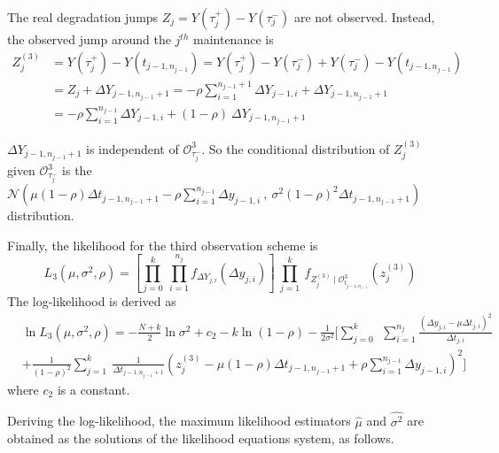 \noindent The real degradation jumps $Z_j = Y(\tau_{j}^+) - Y(\tau_{j}^-)$ are not observed.
Instead, the observed jump around the $j^{th}$ maintenance is 
\begin{align}
Z_j^{(3)} &= Y(\tau_j^+)-Y(t_{j-1,n_{j-1}}) = Y(\tau_j^+)-Y(\tau_j^-)+Y(\tau_j^-)-Y(t_{j-1,n_{j-1}}) \nonumber \\
&= Z_j +\Delta Y_{j-1,n_{j-1}+1} = -\rho\sum\limits_{i=1}^{n_{j-1}+1}\Delta Y_{j-1,i} + \Delta Y_{j-1,n_{j-1}+1} \nonumber \\
&= -\rho\sum\limits_{i=1}^{n_{j-1}}\Delta Y_{j-1,i} + (1-\rho)\ \Delta Y_{j-1,n_{j-1}+1} \label{eq:Zj3}
\end{align}

\noindent $\Delta Y_{j-1,n_{j-1}+1}$ is independent of $\mathcal{O}_{\tau_j^-}^3$. So the conditional distribution of $Z_j^{(3)}$ given $\mathcal{O}_{\tau_j^-}^3$ is the $\mathcal{N}\left(\mu (1-\rho) \Delta t_{j-1,n_{j-1}+1}-\rho \sum\limits_{i=1}^{n_{j-1}} \Delta y_{j-1,i}\ ,\ \sigma^2 (1-\rho)^2 \Delta t_{j-1,n_{j-1}+1}\right)$ distribution.

\noindent Finally, the likelihood for the third observation scheme is
\begin{equation}
L_3\left(\mu,\sigma^2,\rho \right)
= \left[ \prod \limits_{j=0}^{k} \ \prod \limits_{i=1}^{n_{j}}  f_{\Delta Y_{j,i}}(\Delta y_{j,i}) \right]\ 
 \prod \limits_{j=1}^{k}\ f_{Z_j^{(3)} \mid  \mathcal{O}_{t_{j-1,n_{j-1}}}^3}(z_j^{(3)}) 
\label{eq:like_scheme3}
\end{equation}
\noindent The log-likelihood is derived as
\begin{align}
&\ln L_3\left(\mu,\sigma^2,\rho \right)= - \frac{N+k}{2} \ln \sigma^2 + c_2 - k \ln (1-\rho)
- \frac{1}{2 \sigma^2} \Bigg[\sum\limits_{j=0}^{k}\ \ \sum\limits_{i=1}^{n_j}
\frac{\left(\Delta y_{j,i} -\mu \Delta t_{j,i}\right)^2}{\Delta t_{j,i}} \nonumber\\
&+ \frac{1}{(1-\rho)^2} \sum\limits_{j=1}^{k}\ \frac{1}{\Delta t_{j-1,n_{j-1}+1}}
\left(z_j^{(3)}-\mu (1-\rho)\Delta t_{j-1,n_{j-1}+1}+\rho \sum \limits_{i=1}^{n_{j-1}}\Delta y_{j-1,i}\right)^2 \Bigg]
\label{eq:loglike_scheme3}
\end{align}
\noindent where $c_2$ is a constant.

\vspace{3mm}

\noindent Deriving the log-likelihood, the maximum likelihood estimators $\hat{\mu}$ and $\hat{\sigma^2}$ are obtained as the solutions of the likelihood equations system, as follows.


